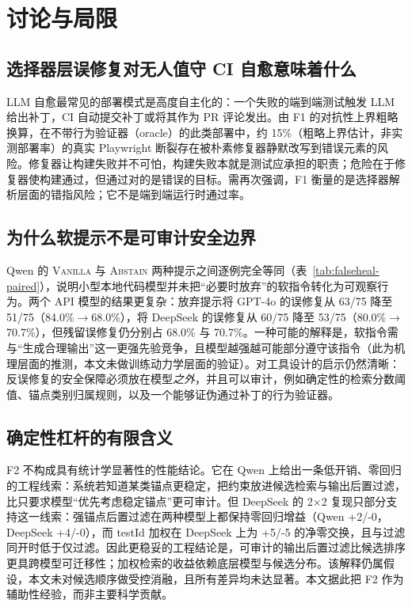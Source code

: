 \section{讨论与局限}
\label{sec:discussion}

\subsection{选择器层误修复对无人值守 CI 自愈意味着什么}
LLM 自愈最常见的部署模式是高度自主化的：一个失败的端到端测试触发 LLM 给出补丁，CI 自动提交补丁或将其作为 PR 评论发出。由 F1 的对抗性上界粗略换算，在不带行为验证器（oracle）的此类部署中，约 15\%（粗略上界估计，非实测部署率）的真实 Playwright 断裂存在被朴素修复器静默改写到错误元素的风险。修复器让构建失败并不可怕，构建失败本就是测试应承担的职责；危险在于修复器使构建通过，但通过对的是错误的目标。需再次强调，F1 衡量的是选择器解析层面的错指风险；它不是端到端运行时通过率。

\subsection{为什么软提示不是可审计安全边界}
Qwen 的 \textsc{Vanilla} 与 \textsc{Abstain} 两种提示之间逐例完全等同（表~\ref{tab:falseheal-paired}），说明小型本地代码模型并未把“必要时放弃”的软指令转化为可观察行为。两个 API 模型的结果更复杂：放弃提示将 GPT-4o 的误修复从 63/75 降至 51/75（84.0\%$\to$68.0\%），将 DeepSeek 的误修复从 60/75 降至 53/75（80.0\%$\to$70.7\%），但残留误修复仍分别占 68.0\% 与 70.7\%。一种可能的解释是，软指令需与“生成合理输出”这一更强先验竞争，且模型越强越可能部分遵守该指令（此为机理层面的推测，本文未做训练动力学层面的验证）。对工具设计的启示仍然清晰：反误修复的安全保障必须放在模型\emph{之外}，并且可以审计，例如确定性的检索分数阈值、锚点类别归属规则，以及一个能够证伪通过补丁的行为验证器。

\subsection{确定性杠杆的有限含义}
F2 不构成具有统计学显著性的性能结论。它在 Qwen 上给出一条低开销、零回归的工程线索：系统若知道某类锚点更稳定，把约束放进候选检索与输出后置过滤，比只要求模型“优先考虑稳定锚点”更可审计。但 DeepSeek 的 2$\times$2 复现只部分支持这一线索：强锚点后置过滤在两种模型上都保持零回归增益（Qwen +2/-0，DeepSeek +4/-0），而 testId 加权在 DeepSeek 上为 +5/-5 的净零交换，且与过滤同开时低于仅过滤。因此更稳妥的工程结论是，可审计的输出后置过滤比候选排序更具跨模型可迁移性；加权检索的收益依赖底层模型与候选分布。该解释仍属假设，本文未对候选顺序做受控消融，且所有差异均未达显著。本文据此把 F2 作为辅助性经验，而非主要科学贡献。

